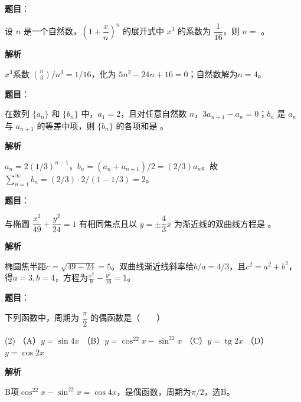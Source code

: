 \begin{answer}

\textbf{题目}：

设 $n$ 是一个自然数，$\left(1+\dfrac{x}{n}\right)^n$ 的展开式中 $x^3$ 的系数为 $\dfrac1{16}$，则 $n=$ \gkblank{}。

\textbf{解析}

$x^3$系数 $\binom n3/n^3=1/16$，化为 $5n^2-24n+16=0$；自然数解为$n=4$。


\end{answer}
\begin{answer}

\textbf{题目}：

在数列 $\{a_n\}$ 和 $\{b_n\}$ 中，$a_1=2$，且对任意自然数 $n$，$3a_{n+1}-a_n=0$；$b_n$ 是 $a_n$ 与 $a_{n+1}$ 的等差中项，则 $\{b_n\}$ 的各项和是 \gkblank{}。

\textbf{解析}

$a_n=2(1/3)^{n-1}$，$b_n=(a_n+a_{n+1})/2=(2/3)a_n$。故$\sum_{n=1}^\infty b_n=(2/3)\cdot 2/(1-1/3)=2$。


\end{answer}
\begin{answer}

\textbf{题目}：

与椭圆 $\dfrac{x^2}{49}+\dfrac{y^2}{24}=1$ 有相同焦点且以 $y=\pm\dfrac43x$ 为渐近线的双曲线方程是 \gkblank{}。

\textbf{解析}

椭圆焦半距$c=\sqrt{49-24}=5$。双曲线渐近线斜率给$b/a=4/3$，且$c^2=a^2+b^2$，得$a=3,b=4$，方程为$\frac{x^2}{9}-\frac{y^2}{16}=1$。


\end{answer}
\begin{answer}

\textbf{题目}：

下列函数中，周期为 $\dfrac\pi2$ 的偶函数是\mbox{（　　）}

\begin{gkopts}(2)
\task （A）$y=\sin4x$
\task （B）$y=\cos^22x-\sin^22x$
\task （C）$y=\operatorname{tg}2x$
\task （D）$y=\cos2x$
\end{gkopts}

\textbf{解析}

B项$\cos^22x-\sin^22x=\cos4x$，是偶函数，周期为$\pi/2$，选B。


\end{answer}
